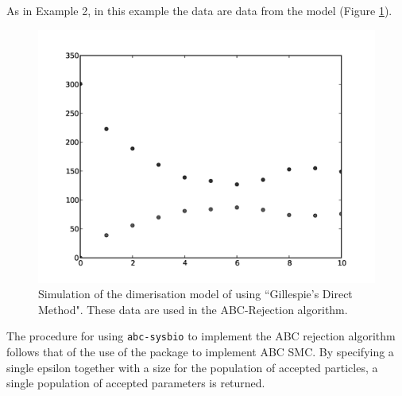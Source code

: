 \documentclass[a4paper]{report}
\begin{document}
As in Example 2, in this example the data are data from the model (Figure \ref{DimerisationData}).
\begin{figure}[htbp]
\begin{center}
\includegraphics[width=1.0\textwidth]{Graphics/DimerisationData.png}
\caption{Simulation of the dimerisation model of \citep{Gillespie1977} using ``Gillespie's Direct Method". These data are used in the ABC-Rejection algorithm.}
\label{DimerisationData}
\end{center}
\end{figure}
The procedure for using \verb$abc-sysbio$ to implement the ABC rejection algorithm follows that of the use of the package to implement ABC SMC. By specifying a single epsilon together with a size for the population of accepted particles, a single population of accepted parameters is returned.
\end{document}
